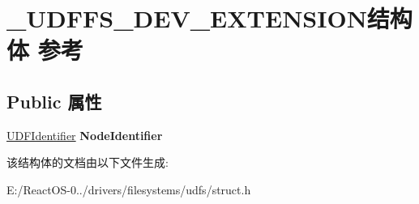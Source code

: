 \hypertarget{struct___u_d_f_f_s___d_e_v___e_x_t_e_n_s_i_o_n}{}\section{\+\_\+\+U\+D\+F\+F\+S\+\_\+\+D\+E\+V\+\_\+\+E\+X\+T\+E\+N\+S\+I\+O\+N结构体 参考}
\label{struct___u_d_f_f_s___d_e_v___e_x_t_e_n_s_i_o_n}
\subsection*{Public 属性}
\begin{DoxyCompactItemize}
\item 
\mbox{\label{struct___u_d_f_f_s___d_e_v___e_x_t_e_n_s_i_o_n_ac572b4792ae914013d19047aac1bb5d0}} 
\hyperlink{struct___u_d_f_identifier}{U\+D\+F\+Identifier} {\bfseries Node\+Identifier}
\end{DoxyCompactItemize}


该结构体的文档由以下文件生成\+:\begin{DoxyCompactItemize}
\item 
E\+:/\+React\+O\+S-\/0../drivers/filesystems/udfs/struct.\+h\end{DoxyCompactItemize}
